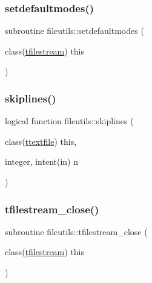 \mbox{\label{namespacefileutils_ab29c958b3ef2154cee501206eeeab071}} 
\subsubsection{\texorpdfstring{setdefaultmodes()}{setdefaultmodes()}}
{\footnotesize\ttfamily subroutine fileutils\+::setdefaultmodes (\begin{DoxyParamCaption}\item[{class(\mbox{\hyperlink{structfileutils_1_1tfilestream}{tfilestream}})}]{this }\end{DoxyParamCaption})\hspace{0.3cm}{\ttfamily [private]}}

\mbox{\label{namespacefileutils_ae9b000065603bdcdab84740b77c43983}} 
\subsubsection{\texorpdfstring{skiplines()}{skiplines()}}
{\footnotesize\ttfamily logical function fileutils\+::skiplines (\begin{DoxyParamCaption}\item[{class(\mbox{\hyperlink{structfileutils_1_1ttextfile}{ttextfile}})}]{this,  }\item[{integer, intent(in)}]{n }\end{DoxyParamCaption})\hspace{0.3cm}{\ttfamily [private]}}

\mbox{\label{namespacefileutils_a92f8878926ad7488d2cdaf82a8d09d6a}} 
\subsubsection{\texorpdfstring{tfilestream\+\_\+close()}{tfilestream\_close()}}
{\footnotesize\ttfamily subroutine fileutils\+::tfilestream\+\_\+close (\begin{DoxyParamCaption}\item[{class(\mbox{\hyperlink{structfileutils_1_1tfilestream}{tfilestream}})}]{this }\end{DoxyParamCaption})\hspace{0.3cm}{\ttfamily [private]}}

